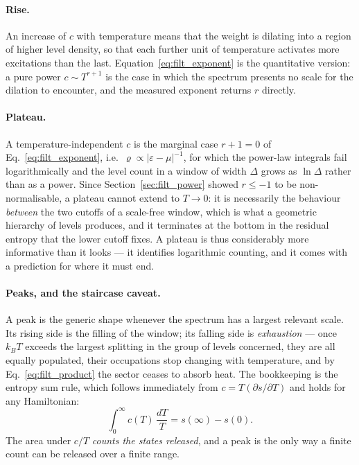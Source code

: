 \documentclass[10pt,a4paper]{article}
\theoremstyle{plain}
\theoremstyle{remark}
\begin{document}
\paragraph{Rise.} An increase of $c$ with temperature means that the weight is
dilating into a region of higher level density, so that each further unit of
temperature activates more excitations than the last. Equation~\eqref{eq:filt_exponent}
is the quantitative version: a pure power $c\sim T^{r+1}$ is the case in which the
spectrum presents no scale for the dilation to encounter, and the measured
exponent returns $r$ directly.

\paragraph{Plateau.} A temperature-independent $c$ is the marginal case
$r+1=0$ of Eq.~\eqref{eq:filt_exponent}, i.e.\ $\varrho\propto|\varepsilon-\mu|^{-1}$,
for which the power-law integrals fail logarithmically and the level count in a
window of width $\Delta$ grows as $\ln\Delta$ rather than as a power. Since
Section~\ref{sec:filt_power} showed $r\le-1$ to be non-normalisable, a plateau
cannot extend to $T\to0$: it is necessarily the behaviour \emph{between} the two
cutoffs of a scale-free window, which is what a geometric hierarchy of levels
produces, and it terminates at the bottom in the residual entropy that the lower
cutoff fixes. A plateau is thus considerably more informative than it looks --- it
identifies logarithmic counting, and it comes with a prediction for where it must
end.

\paragraph{Peaks, and the staircase caveat.} A peak is the generic shape whenever
the spectrum has a largest relevant scale. Its rising side is the filling of the
window; its falling side is \emph{exhaustion} --- once $k_BT$ exceeds the largest
splitting in the group of levels concerned, they are all equally populated, their
occupations stop changing with temperature, and by
Eq.~\eqref{eq:filt_product} the sector ceases to absorb heat. The bookkeeping is
the entropy sum rule, which follows immediately from $c=T(\partial s/\partial T)$ and
holds for any Hamiltonian:
\begin{equation}\label{eq:filt_sumrule}
\int_0^{\infty}c(T)\,\frac{dT}{T}=s(\infty)-s(0).
\end{equation}
The area under $c/T$ \emph{counts the states released}, and a peak is the only
way a finite count can be released over a finite range.
\end{document}
